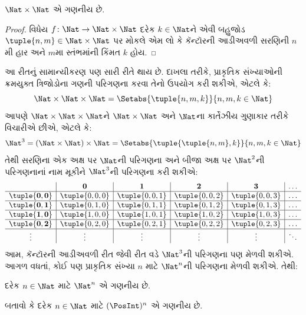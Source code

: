 \begin{prop}
$\Nat \times \Nat$ એ ગણનીય છે.
\end{prop}

\begin{proof}
વિધેય $f \colon \Nat \to \Nat\times\Nat$ દરેક
$k \in \Nat$ને એવી બહુજોડ
$\tuple{n,m} \in \Nat \times \Nat$ પર મોકલે એમ લો
કે કૅન્ટૉરની આડીઅવળી સરણિની $n$મી હાર અને
$m$મા સ્તંભમાંની કિંમત $k$ હોય.
\end{proof}

\begin{explain}
આ રીતનું સામાન્યીકરણ પણ સારી રીતે થાય છે. દાખલા તરીકે,
પ્રાકૃતિક સંખ્યાઓની ક્રમયુક્ત ત્રિજોડોના ગણની પરિગણના
કરવા તેનો ઉપયોગ કરી શકીએ, એટલે કે:
\[
\Nat \times \Nat \times \Nat = \Setabs{\tuple{n,m,k}}{n,m,k \in \Nat}
\]
આપણે $\Nat \times \Nat \times \Nat$ને
$\Nat \times \Nat$ અને $\Nat$ના કાર્તેઝીય ગુણાકાર
તરીકે વિચારીએ છીએ, એટલે કે:
\[
\Nat^3 = (\Nat \times \Nat) \times \Nat =
\Setabs{\tuple{\tuple{n,m},k}}{n, m, k
  \in \Nat }
\]
તેથી સરણિના એક અક્ષ પર $\Nat$ની પરિગણના
અને બીજા અક્ષ પર $\Nat^2$ની પરિગણનાનાં નામ
મૂકીને $\Nat^3$ની પરિગણના કરી શકીએ:
\[
\begin{array}{ c | c | c | c | c | c}
& \mathbf 0 & \mathbf 1 & \mathbf 2 & \mathbf 3 & \dots \\
\hline
\mathbf{\tuple{0,0}} & \tuple{0,0,0} & \tuple{0,0,1} & \tuple{0,0,2} & \tuple{0,0,3} & \dots \\
\hline
\mathbf{\tuple{0,1}} & \tuple{0,1,0} & \tuple{0,1,1} & \tuple{0,1,2} & \tuple{0,1,3} & \dots \\
\hline
\mathbf{\tuple{1,0}} & \tuple{1,0,0} & \tuple{1,0,1} & \tuple{1,0,2} & \tuple{1,0,3} & \dots \\
\hline
\mathbf{\tuple{0,2}} & \tuple{0,2,0} & \tuple{0,2,1} & \tuple{0,2,2} & \tuple{0,2,3} & \dots\\
\hline
\vdots & \vdots & \vdots & \vdots & \vdots & \ddots \\
\end{array}
\]
આમ, કૅન્ટૉરની આડીઅવળી રીત જેવી રીત વડે
$\Nat^3$ની પરિગણના પણ મેળવી શકીએ.
આગળ વધતાં, કોઈ પણ પ્રાકૃતિક સંખ્યા $n$ માટે
$\Nat^n$ની પરિગણના મેળવી શકીએ. તેથી:
\end{explain}

\begin{prop}
દરેક $n \in \Nat$ માટે $\Nat^n$ એ ગણનીય છે.
\end{prop}

\begin{prob}\label{sfr:siz:zigzag:prob:posint-n}
બતાવો કે દરેક $n \in \Nat$ માટે $(\PosInt)^n$
એ ગણનીય છે.
\end{prob}

